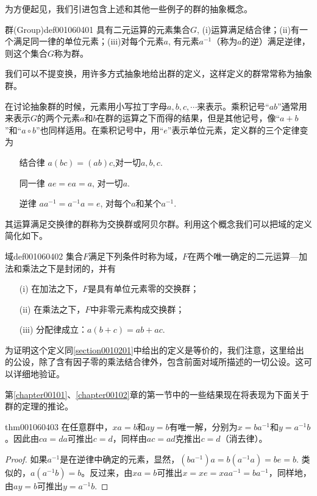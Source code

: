 为方便起见，我们引进包含上述和其他一些例子的群的抽象概念。

\begin{definition}{群(Group)}{def001060401}
具有二元运算的元素集合$G$, (i)运算满足结合律；(ii)有一个满足同一律的单位元素；(iii)对每个元素$a$, 有元素$a^{-1}$（称为$a$的逆）满足逆律，则这个集合$G$称为群。
\end{definition}

我们可以不提变换，用许多方式抽象地给出群的定义，这样定义的群常常称为抽象群。

在讨论抽象群的时候，元素用小写拉丁字母$a,b,c,\cdots$来表示。乘积记号“$ab$”通常用来表示$G$的两个元素$a$和$b$在群的运算之下而得的结果，但是其他记号，像“$a+b$”和“$a \circ b$”也同样适用。在乘积记号中，用“$e$”表示单位元素，定义群的三个定律变为
\begin{enumerate}
\item[结合律] $a(bc) = (ab)c$,对一切$a,b,c$.
\item[同一律] $ae = ea = a$, 对一切$a$.
\item[逆律]$aa^{-1} = a^{-1}a = e$, 对每个$a$和某个$a^{-1}$.
\end{enumerate}

其运算满足交换律的群称为交换群或阿贝尔群。利用这个概念我们可以把域的定义简化如下。

\begin{definition}{域}{def001060402}
集合$F$满足下列条件时称为域，$F$在两个唯一确定的二元运算---加法和乘法之下是封闭的，并有
\begin{enumerate}
\item[(i)]在加法之下，$F$是具有单位元素零的交换群；
\item[(ii)]在乘法之下，$F$中非零元素构成交换群；
\item[(iii)]分配律成立：$a(b+c) = ab+ac$.
\end{enumerate}
\end{definition}

为证明这个定义同\ref{section0010201}中给出的定义是等价的，我们注意，这里给出的公设，除了含有因子零的乘法结合律外，包含前面对域所描述的一切公设。这可以详细地验证。

第\ref{chapter00101}、\ref{chapter00102}章的第一节中的一些结果现在将表现为下面关于群的定理的推论。
\begin{theorem}{}{thm001060403}
在任意群中，$xa=b$和$ay=b$有唯一解，分别为$x=ba^{-1}$和$y=a^{-1}b$。因此由$ca=da$可推出$c=d$，同样由$ac=ad$克推出$c=d$（消去律）。
\end{theorem}

\begin{proof}
如果$a^{-1}$是在逆律中确定的元素，显然，$(ba^{-1})a=b(a^{-1}a)=be=b$. 类似的，$a(a^{-1}b)=b$。反过来，由$xa=b$可推出$x=xe=xaa^{-1}=ba^{-1}$，同样地，由$ay=b$可推出$y=a^{-1}b$.
\end{proof}

